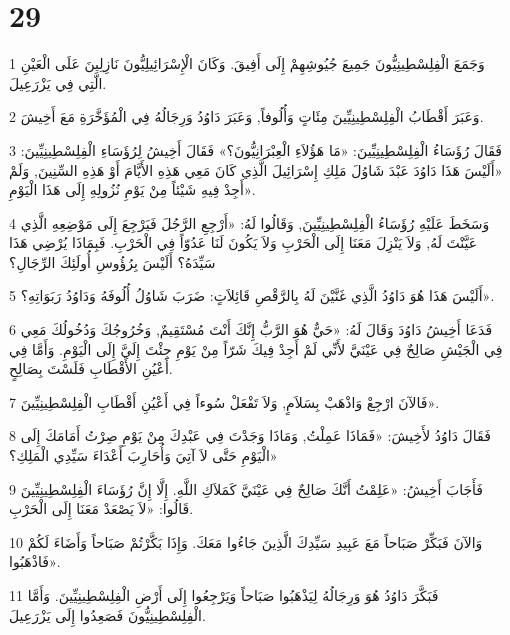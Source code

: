 \chapter{29}

\par 1 وَجَمَعَ الْفِلِسْطِينِيُّونَ جَمِيعَ جُيُوشِهِمْ إِلَى أَفِيقَ. وَكَانَ الْإِسْرَائِيلِيُّونَ نَازِلِينَ عَلَى الْعَيْنِ الَّتِي فِي يَزْرَعِيلَ.
\par 2 وَعَبَرَ أَقْطَابُ الْفِلِسْطِينِيِّينَ مِئَاتٍ وَأُلُوفاً, وَعَبَرَ دَاوُدُ وَرِجَالُهُ فِي الْمُؤَخَّرَةِ مَعَ أَخِيشَ.
\par 3 فَقَالَ رُؤَسَاءُ الْفِلِسْطِينِيِّينَ: «مَا هَؤُلاَءِ الْعِبْرَانِيُّونَ؟» فَقَالَ أَخِيشُ لِرُؤَسَاءِ الْفِلِسْطِينِيِّينَ: «أَلَيْسَ هَذَا دَاوُدَ عَبْدَ شَاوُلَ مَلِكِ إِسْرَائِيلَ الَّذِي كَانَ مَعِي هَذِهِ الأَيَّامَ أَوْ هَذِهِ السِّنِينَ, وَلَمْ أَجِدْ فِيهِ شَيْئاً مِنْ يَوْمِ نُزُولِهِ إِلَى هَذَا الْيَوْمِ».
\par 4 وَسَخَطَ عَلَيْهِ رُؤَسَاءُ الْفِلِسْطِينِيِّينَ, وَقَالُوا لَهُ: «أَرْجِعِ الرَّجُلَ فَيَرْجِعَ إِلَى مَوْضِعِهِ الَّذِي عَيَّنْتَ لَهُ, وَلاَ يَنْزِلَ مَعَنَا إِلَى الْحَرْبِ وَلاَ يَكُونَ لَنَا عَدُوّاً فِي الْحَرْبِ. فَبِمَاذَا يُرْضِي هَذَا سَيِّدَهُ؟ أَلَيْسَ بِرُؤُوسِ أُولَئِكَ الرِّجَالِ؟
\par 5 أَلَيْسَ هَذَا هُوَ دَاوُدُ الَّذِي غَنَّيْنَ لَهُ بِالرَّقْصِ قَائِلاَتٍ: ضَرَبَ شَاوُلُ أُلُوفَهُ وَدَاوُدُ رَبَوَاتِهِ؟».
\par 6 فَدَعَا أَخِيشُ دَاوُدَ وَقَالَ لَهُ: «حَيٌّ هُوَ الرَّبُّ إِنَّكَ أَنْتَ مُسْتَقِيمٌ, وَخُرُوجُكَ وَدُخُولُكَ مَعِي فِي الْجَيْشِ صَالِحٌ فِي عَيْنَيَّ لأَنِّي لَمْ أَجِدْ فِيكَ شَرّاً مِنْ يَوْمِ جِئْتَ إِلَيَّ إِلَى الْيَوْمِ. وَأَمَّا فِي أَعْيُنِ الأَقْطَابِ فَلَسْتَ بِصَالِحٍ.
\par 7 فَالآنَ ارْجِعْ وَاذْهَبْ بِسَلاَمٍ, وَلاَ تَفْعَلْ سُوءاً فِي أَعْيُنِ أَقْطَابِ الْفِلِسْطِينِيِّينَ».
\par 8 فَقَالَ دَاوُدُ لأَخِيشَ: «فَمَاذَا عَمِلْتُ, وَمَاذَا وَجَدْتَ فِي عَبْدِكَ مِنْ يَوْمِ صِرْتُ أَمَامَكَ إِلَى الْيَوْمِ حَتَّى لاَ آتِيَ وَأُحَارِبَ أَعْدَاءَ سَيِّدِي الْمَلِكِ؟»
\par 9 فَأَجَابَ أَخِيشُ: «عَلِمْتُ أَنَّكَ صَالِحٌ فِي عَيْنَيَّ كَمَلاَكِ اللَّهِ. إِلَّا إِنَّ رُؤَسَاءَ الْفِلِسْطِينِيِّينَ قَالُوا: «لاَ يَصْعَدْ مَعَنَا إِلَى الْحَرْبِ.
\par 10 وَالآنَ فَبَكِّرْ صَبَاحاً مَعَ عَبِيدِ سَيِّدِكَ الَّذِينَ جَاءُوا مَعَكَ. وَإِذَا بَكَّرْتُمْ صَبَاحاً وَأَضَاءَ لَكُمْ فَاذْهَبُوا».
\par 11 فَبَكَّرَ دَاوُدُ هُوَ وَرِجَالُهُ لِيَذْهَبُوا صَبَاحاً وَيَرْجِعُوا إِلَى أَرْضِ الْفِلِسْطِينِيِّينَ. وَأَمَّا الْفِلِسْطِينِيُّونَ فَصَعِدُوا إِلَى يَزْرَعِيلَ.

